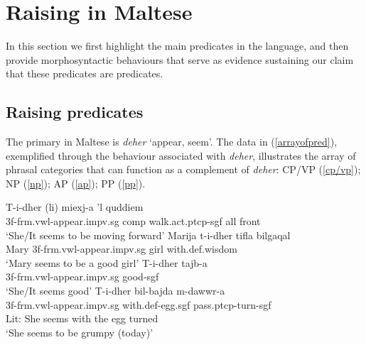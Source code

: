 \documentclass[output=paper]{LSP/langsci}
\begin{document}
\section{Raising in Maltese}

In this section we first highlight the main  predicates in the language, and then provide morphosyntactic behaviours that serve as evidence sustaining our claim that these predicates are  predicates.

\subsection{Raising predicates}

The primary  in Maltese is \emph{deher} `appear, seem'. The data in (\ref{arrayofpred}), exemplified through the behaviour associated with \emph{deher}, illustrates the array of phrasal categories that can function as a complement of \emph{deher}: CP/VP (\ref{cp/vp}); NP (\ref{np}); AP (\ref{ap}); PP (\ref{pp}).

\ea \label{arrayofpred}
\ea \label{cp/vp}
\gll T-i-dher (li) miexj-a 'l quddiem\\
3{\sc f}-{\sc frm.vwl}-appear.{\sc impv.sg} {\sc comp} walk.{\sc act.ptcp-sgf} {\sc all} front\\
\glt `She/It seems to be moving forward'
\newpage 
\ex \label{np}
\gll Marija t-i-dher tifla bilg\textcrh aqal{\footnotemark}\\
Mary 3{\sc f}-{\sc frm.vwl}-appear.{\sc impv.sg} girl with.{\sc def.}wisdom\\
\glt `Mary seems to be a good girl'
\ex \label{ap}
\gll T-i-dher tajb-a\\
3{\sc f}-{\sc frm.vwl}-appear.{\sc impv.sg} good-{\sc sgf}\\
\glt `She/It seems good'
\ex \label{pp}
\gll T-i-dher bil-bajda m-dawwr-a\\
3{\sc f}-{\sc frm.vwl}-appear.{\sc impv.sg} with.{\sc def-}egg.{\sc sgf} {\sc pass.ptcp}-turn-{\sc sgf}\\
\glt Lit: She seems with the egg turned\\
\glt `She seems to be grumpy (today)'
\z
\z 
{}
\end{document}
